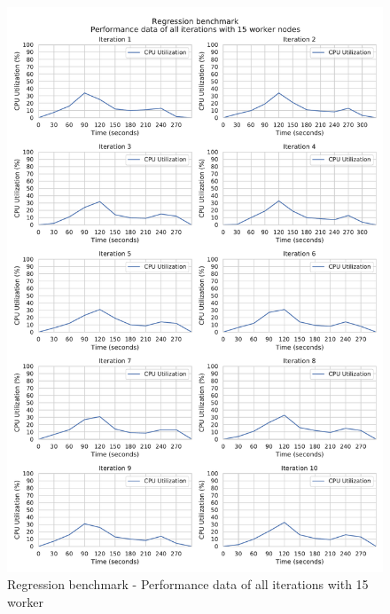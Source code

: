 \begin{figure}[h]
\centering
\includegraphics[scale=0.5]{images/appendix/evaluation_data/regression_benchmark/regression_15_worker_cpu_performance}
\caption{Regression benchmark - Performance data of all iterations with 15 worker}
\label{fig:appendix_eval_regression_static15}
\end{figure}

